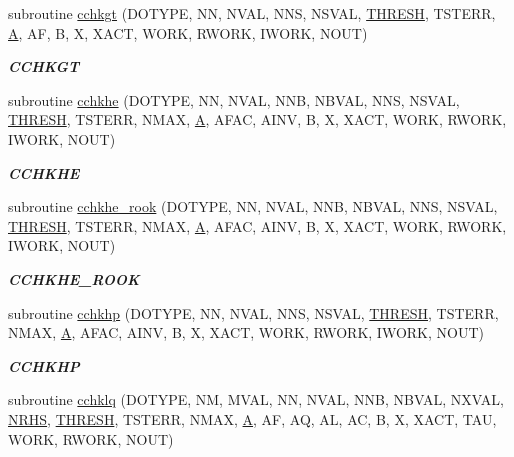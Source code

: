\begin{DoxyCompactItemize}
subroutine \hyperlink{group__complex__lin_gad46e64ec16238cce89b3b7af84d965dd}{cchkgt} (D\+O\+T\+Y\+P\+E, N\+N, N\+V\+A\+L, N\+N\+S, N\+S\+V\+A\+L, \hyperlink{zlaqgs_8c_a0656018abfc9fa2821827415f5d5ea57}{T\+H\+R\+E\+S\+H}, T\+S\+T\+E\+R\+R, \hyperlink{classA}{A}, A\+F, B, X, X\+A\+C\+T, W\+O\+R\+K, R\+W\+O\+R\+K, I\+W\+O\+R\+K, N\+O\+U\+T)
\begin{DoxyCompactList}\small\item\em {\bfseries C\+C\+H\+K\+G\+T} \end{DoxyCompactList}\item 
subroutine \hyperlink{group__complex__lin_gacd2200b4cfc831901ae688d3872cd33d}{cchkhe} (D\+O\+T\+Y\+P\+E, N\+N, N\+V\+A\+L, N\+N\+B, N\+B\+V\+A\+L, N\+N\+S, N\+S\+V\+A\+L, \hyperlink{zlaqgs_8c_a0656018abfc9fa2821827415f5d5ea57}{T\+H\+R\+E\+S\+H}, T\+S\+T\+E\+R\+R, N\+M\+A\+X, \hyperlink{classA}{A}, A\+F\+A\+C, A\+I\+N\+V, B, X, X\+A\+C\+T, W\+O\+R\+K, R\+W\+O\+R\+K, I\+W\+O\+R\+K, N\+O\+U\+T)
\begin{DoxyCompactList}\small\item\em {\bfseries C\+C\+H\+K\+H\+E} \end{DoxyCompactList}\item 
subroutine \hyperlink{group__complex__lin_gaf2ed9b4e35b7d4a7635fa3472f299730}{cchkhe\+\_\+rook} (D\+O\+T\+Y\+P\+E, N\+N, N\+V\+A\+L, N\+N\+B, N\+B\+V\+A\+L, N\+N\+S, N\+S\+V\+A\+L, \hyperlink{zlaqgs_8c_a0656018abfc9fa2821827415f5d5ea57}{T\+H\+R\+E\+S\+H}, T\+S\+T\+E\+R\+R, N\+M\+A\+X, \hyperlink{classA}{A}, A\+F\+A\+C, A\+I\+N\+V, B, X, X\+A\+C\+T, W\+O\+R\+K, R\+W\+O\+R\+K, I\+W\+O\+R\+K, N\+O\+U\+T)
\begin{DoxyCompactList}\small\item\em {\bfseries C\+C\+H\+K\+H\+E\+\_\+\+R\+O\+O\+K} \end{DoxyCompactList}\item 
subroutine \hyperlink{group__complex__lin_gaf5d86850935b50c2e3a80c3bb908e4d1}{cchkhp} (D\+O\+T\+Y\+P\+E, N\+N, N\+V\+A\+L, N\+N\+S, N\+S\+V\+A\+L, \hyperlink{zlaqgs_8c_a0656018abfc9fa2821827415f5d5ea57}{T\+H\+R\+E\+S\+H}, T\+S\+T\+E\+R\+R, N\+M\+A\+X, \hyperlink{classA}{A}, A\+F\+A\+C, A\+I\+N\+V, B, X, X\+A\+C\+T, W\+O\+R\+K, R\+W\+O\+R\+K, I\+W\+O\+R\+K, N\+O\+U\+T)
\begin{DoxyCompactList}\small\item\em {\bfseries C\+C\+H\+K\+H\+P} \end{DoxyCompactList}\item 
subroutine \hyperlink{group__complex__lin_ga38b27a8893ed711b029f50feb1133e76}{cchklq} (D\+O\+T\+Y\+P\+E, N\+M, M\+V\+A\+L, N\+N, N\+V\+A\+L, N\+N\+B, N\+B\+V\+A\+L, N\+X\+V\+A\+L, \hyperlink{example__user_8c_aa0138da002ce2a90360df2f521eb3198}{N\+R\+H\+S}, \hyperlink{zlaqgs_8c_a0656018abfc9fa2821827415f5d5ea57}{T\+H\+R\+E\+S\+H}, T\+S\+T\+E\+R\+R, N\+M\+A\+X, \hyperlink{classA}{A}, A\+F, A\+Q, A\+L, A\+C, B, X, X\+A\+C\+T, T\+A\+U, W\+O\+R\+K, R\+W\+O\+R\+K, N\+O\+U\+T)

\end{DoxyCompactItemize}
